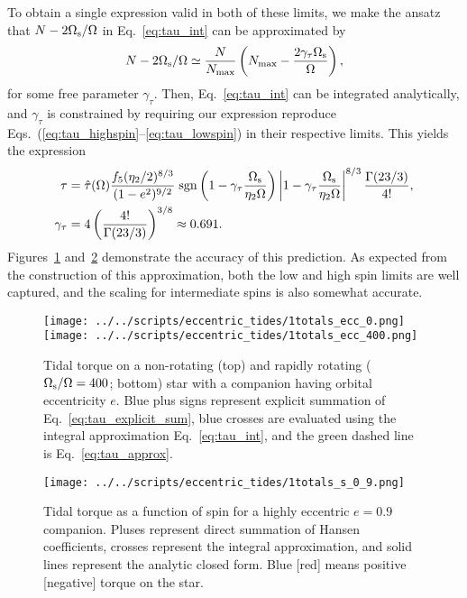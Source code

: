 \documentclass[
        fleqn,
        usenatbib,
    ]{mnras}
\newcommand*{\p}[1]{\left(#1\right)}
\begin{document}
To obtain a single expression valid in both of these limits, we make the ansatz
that $N - 2\Omega_{\rm s}/\Omega$ in Eq.~\eqref{eq:tau_int} can be approximated
by
\begin{equation}
    N - 2\Omega_{\rm s} / \Omega \simeq \frac{N}{N_{\max}}
        \left(N_{\max} - \frac{2\gamma_\tau
        \Omega_{\rm s}}{\Omega}\right)\label{eq:nmax_ansatz},
\end{equation}
for some free parameter $\gamma_\tau$. Then, Eq.~\eqref{eq:tau_int} can be
integrated analytically, and $\gamma_\tau$ is constrained by requiring our
expression reproduce Eqs.~(\ref{eq:tau_highspin}--\ref{eq:tau_lowspin}) in their
respective limits. This yields the expression
\begin{align}
    \tau &= \hat{\tau}(\Omega) \frac{f_5 (\eta_2/2)^{8/3}}{(1 - e^2)^{9/2}}
        \;\mathrm{sgn}\left(1 - \gamma_\tau\frac{\Omega_{\rm s}}{\eta_2\Omega}\right)
            \left|1 - \gamma_\tau\frac{\Omega_{\rm s}}{\eta_2\Omega}\right|^{8/3}
            \frac{\Gamma(23/3)}{4!},\label{eq:tau_approx}\\
    \gamma_\tau &= 4\p{\frac{4!}{\Gamma(23/3)}}^{3/8} \approx 0.691.
\end{align}
Figures~\ref{fig:totals_ecc0} and~\ref{fig:totals_s} demonstrate the accuracy of
this prediction. As expected from the construction of this approximation, both
the low and high spin limits are well captured, and the scaling for intermediate
spins is also somewhat accurate.
\begin{figure}
    \centering
    \texttt{[image: ../../scripts/eccentric\_tides/1totals\_ecc\_0.png]}
    \texttt{[image: ../../scripts/eccentric\_tides/1totals\_ecc\_400.png]}
    \caption{Tidal torque on a non-rotating (top) and rapidly rotating
    ($\Omega_{\rm s} / \Omega = 400$; bottom) star with a companion having
    orbital eccentricity $e$. Blue plus signs represent explicit summation of
    Eq.~\eqref{eq:tau_explicit_sum}, blue crosses are evaluated using the
    integral approximation Eq.~\eqref{eq:tau_int}, and the green dashed line
    is Eq.~\eqref{eq:tau_approx}.}\label{fig:totals_ecc0}
\end{figure}
\begin{figure}
    \centering
    \texttt{[image: ../../scripts/eccentric\_tides/1totals\_s\_0\_9.png]}
    \caption{Tidal torque as a function of spin for a highly eccentric $e = 0.9$
    companion. Pluses represent direct summation of Hansen coefficients, crosses
    represent the integral approximation, and solid lines represent the
    analytic closed form. Blue [red] means positive [negative]
    torque on the star.}\label{fig:totals_s}
\end{figure}
\end{document}
